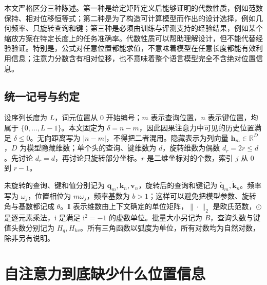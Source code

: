 \documentclass[UTF8,12pt,a4paper,fontset=fandol]{ctexart}
\begin{document}
本文严格区分三种陈述。第一种是给定矩阵定义后能够证明的代数性质，例如范数保持、相对位移恒等式；第二种是为了构造可计算模型而作出的设计选择，例如几何频率、只旋转查询和键；第三种是必须由训练与评测支持的经验结果，例如某个缩放方案在特定长度上的任务准确率。代数性质可以帮助理解设计，但不能代替经验验证。特别是，公式对任意位置都能求值，不意味着模型在任意长度都能有效利用信息；注意力分数含有相对位移，也不意味着整个语言模型完全不含绝对位置信息。

\subsection{统一记号与约定}
设序列长度为 $L$，词元位置从 $0$ 开始编号；$m$ 表示查询位置，$n$ 表示键位置，均属于 $\{0,\ldots,L-1\}$。本文固定为 $\delta=n-m$，因此因果注意力中可见的历史位置满足 $\delta\leq 0$。无向距离写为 $|n-m|$，不得把二者混用。隐藏表示为列向量 $\mathbf h_m\in\mathbb R^D$，$D$ 为模型隐藏维数；单个头的查询、键维数为 $d$，旋转维数为偶数 $d_r=2r\leq d$。先讨论 $d_r=d$，再讨论只旋转部分坐标。$r$ 是二维坐标对的个数，索引 $j$ 从 $0$ 到 $r-1$。

未旋转的查询、键和值分别记为 $\mathbf q_m,\mathbf k_n,\mathbf v_n$，旋转后的查询和键记为 $\widetilde{\mathbf q}_m,\widetilde{\mathbf k}_n$。频率写为 $\omega_j$，位置相位为 $m\omega_j$，频率基数为 $b>1$；这样可以避免把模型参数、旋转角与基数都记成 $\theta$。$\mathbf I$ 表示维数由上下文确定的单位矩阵，$\|\cdot\|_2$ 是欧氏范数，$\odot$ 是逐元素乘法，$\mathrm i$ 是满足 $\mathrm i^2=-1$ 的虚数单位。批量大小另记为 $B$，查询头数与键值头数分别记为 $H_q,H_{kv}$。所有三角函数以弧度为单位，所有对数均为自然对数，除非另有说明。

\section{自注意力到底缺少什么位置信息}
\label{sec:rope-attention}
\end{document}
